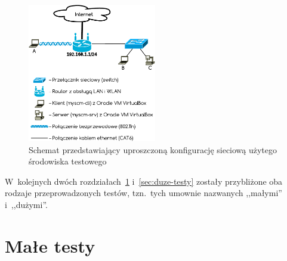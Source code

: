 \documentclass[thesis]{subfiles}
\begin{document}
\begin{figure}
	\centering
	\includegraphics[width=0.5\textwidth]{img/testing-network}
	\caption{Schemat przedstawiający uproszczoną konfigurację sieciową użytego środowiska testowego}
	\label{fig:testing-network}
\end{figure}

W~kolejnych dwóch rozdziałach~\ref{sec:male-testy} i~\ref{sec:duze-testy} zostały przybliżone oba rodzaje przeprowadzonych testów, tzn.~tych umownie nazwanych ,,małymi'' i~,,dużymi''.


\section{Małe testy}
\label{sec:male-testy}
\end{document}
